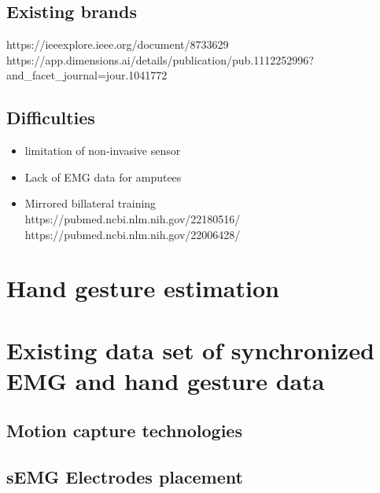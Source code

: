 \documentclass[12pt]{article}
\begin{document}
	\subsection{Existing brands}
	https://ieeexplore.ieee.org/document/8733629 \\
	https://app.dimensions.ai/details/publication/pub.1112252996?and\_facet\_journal=jour.1041772
		
	\subsection{Difficulties}
	\begin{itemize}
		\item limitation of non-invasive sensor
		\item Lack of EMG data for amputees
		\item Mirrored billateral training \\
		https://pubmed.ncbi.nlm.nih.gov/22180516/ \\
		https://pubmed.ncbi.nlm.nih.gov/22006428/
	\end{itemize}
	
	
	
	\section{Hand gesture estimation}
	
	
	
	
	
	
	\section{Existing data set of synchronized EMG and hand gesture data}
	
	
	
	
	
	\subsection{Motion capture technologies \label{sec:motionCaptureTech}}
	
	
	
	
	
	
	\subsection{sEMG Electrodes placement}
	
\end{document}
